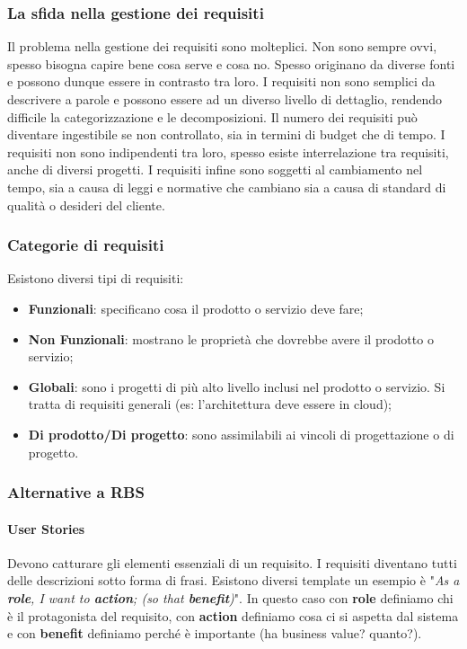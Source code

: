 \subsubsection{La sfida nella gestione dei requisiti}
Il problema nella gestione dei requisiti sono molteplici. Non sono sempre ovvi, spesso bisogna capire bene cosa serve e cosa no. Spesso originano da diverse fonti e possono dunque essere in contrasto tra loro. I requisiti non sono semplici da descrivere a parole e possono essere ad un diverso livello di dettaglio, rendendo difficile la categorizzazione e le decomposizioni. Il numero dei requisiti può diventare ingestibile se non controllato, sia in termini di budget che di tempo. I requisiti non sono indipendenti tra loro, spesso esiste interrelazione tra requisiti, anche di diversi progetti. I requisiti infine sono soggetti al cambiamento nel tempo, sia a causa di leggi e normative che cambiano sia a causa di standard di qualità o desideri del cliente.
\subsubsection{Categorie di requisiti}
Esistono diversi tipi di requisiti:
\begin{itemize}
	\item \textbf{Funzionali}: specificano cosa il prodotto o servizio deve fare;
	\item \textbf{Non Funzionali}: mostrano le proprietà che dovrebbe avere il prodotto o servizio;
	\item \textbf{Globali}: sono i progetti di più alto livello inclusi nel prodotto o servizio. Si tratta di requisiti generali (es: l'architettura deve essere in cloud);
	\item \textbf{Di prodotto/Di progetto}: sono assimilabili ai vincoli di progettazione o di progetto.
\end{itemize}
\subsubsection{Alternative a RBS}
\paragraph{User Stories}
Devono catturare gli elementi essenziali di un requisito. I requisiti diventano tutti delle descrizioni sotto forma di frasi. Esistono diversi template un esempio è "\textit{As a \textbf{role}, I want to \textbf{action}; (so that \textbf{benefit})}". In questo caso con \textbf{role} definiamo chi è il protagonista del requisito, con \textbf{action} definiamo cosa ci si aspetta dal sistema e con \textbf{benefit} definiamo perché è importante (ha business value? quanto?).

